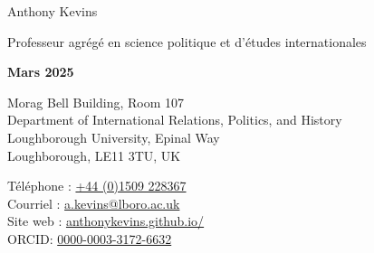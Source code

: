 \documentclass[letterpaper,fontsize=10.5pt]{scrartcl}
\begin{document}


\huge Anthony Kevins\\
\begin{minipage}[t]{.87\linewidth}
	\large Professeur agrégé en science politique et d'études internationales\\
\end{minipage}%
\begin{minipage}[t]{.13\linewidth}
	\raggedleft
	\scriptsize \textbf{Mars 2025}\\
\end{minipage}%
\normalsize

\hrulefill

\begin{minipage}[p]{.6\linewidth}
	\raggedright
	\medskip
	Morag Bell Building, Room 107\\
	Department of International Relations, Politics, and History\\
	Loughborough University, Epinal Way\\
	Loughborough, LE11 3TU, UK\\
	\medskip
\end{minipage}%
\begin{minipage}[p]{.4\linewidth}
	\raggedleft
	\medskip
	Téléphone : \href{tel:+4401509228367}{+44 (0)1509 228367}\\
	Courriel : \href{mailto:a.kevins@lboro.ac.uk}{a.kevins@lboro.ac.uk}\\
	Site web : \href{https://anthonykevins.github.io/fr/}{anthonykevins.github.io/}\\
	ORCID: \href{https://orcid.org/0000-0003-3172-6632}{0000-0003-3172-6632}\\
	\medskip
\end{minipage}%

\hrulefill

\end{document}
